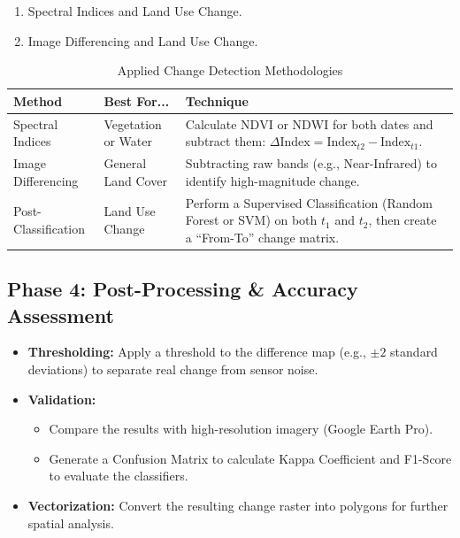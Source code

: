 \documentclass{article}
\begin{document}
\begin{enumerate}
  \item Spectral Indices and Land Use Change.
  \item Image Differencing and Land Use Change.
\end{enumerate}


\begin{table}[!ht]
    \centering
    \caption{Applied Change Detection Methodologies}
    \label{tab:techniques}
    \small
    \begin{tabular}{l p{3.5cm} p{6.5cm}}
        \toprule
            \textbf{Method} & \textbf{Best For...} & \textbf{Technique} \\
        \midrule
            Spectral Indices & Vegetation or Water & Calculate $\text{NDVI}$ or $\text{NDWI}$ for both dates and subtract them: $\Delta \text{Index} = \text{Index}_{t2} - \text{Index}_{t1}$. \\ \addlinespace
            Image Differencing & General Land Cover & Subtracting raw bands (e.g., Near-Infrared) to identify high-magnitude change. \\ \addlinespace
            Post-Classification & Land Use Change & Perform a Supervised Classification (Random Forest or SVM) on both $t_1$ and $t_2$, then create a ``From-To'' change matrix. \\
        \bottomrule
    \end{tabular}
\end{table}

\subsection*{Phase 4: Post-Processing \& Accuracy Assessment}
\begin{itemize}
    \item \textbf{Thresholding:} Apply a threshold to the difference map (e.g., $\pm 2$ standard deviations) to separate real change from sensor noise.
    \item \textbf{Validation:}
    \begin{itemize}
        \item Compare the results with high-resolution imagery (Google Earth Pro).
        \item Generate a Confusion Matrix to calculate Kappa Coefficient and F1-Score to evaluate the classifiers.
    \end{itemize}
    \item \textbf{Vectorization:} Convert the resulting change raster into polygons for further spatial analysis.
\end{itemize}
\end{document}

